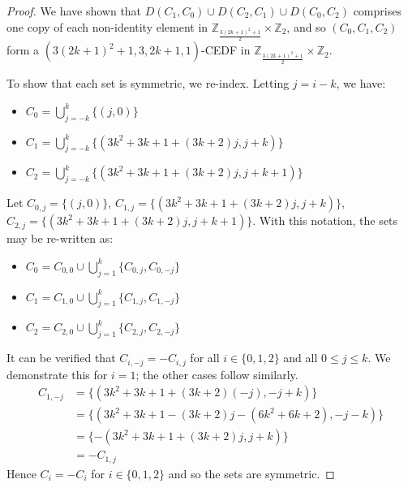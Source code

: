 \documentclass[12pt, a4paper]{article}
\theoremstyle{definition}
\begin{document}
\begin{proof}
We have shown that $D(C_1,C_0) \cup D(C_2,C_1) \cup D(C_0,C_2)$ comprises one copy of each non-identity element in $\mathbb{Z}_{\frac{3(2k+1)^2+1}{2}}\times\mathbb{Z}_2$, and so $(C_0,C_1,C_2)$ form a $(3(2k+1)^2+1,3,2k+1,1)$-CEDF in $\mathbb{Z}_{\frac{3(2k+1)^2+1}{2}}\times\mathbb{Z}_2$.

To show that each set is symmetric, we re-index. Letting $j =i-k$, we have:
\begin{itemize}
\item $C_0=\bigcup_{j=-k}^{k}\{(j,0)\}$
\item $C_1=\bigcup_{j=-k}^{k}\{(3k^2+3k+1+(3k+2)j,j+k)\}$
\item $C_2=\bigcup_{j=-k}^{k}\{(3k^2+3k+1+(3k+2)j,j+k+1)\}$
\end{itemize}
Let $C_{0,j}=\{(j,0)\}$, $C_{1,j}=\{(3k^2+3k+1+(3k+2)j,j+k)\}$, $C_{2,j}=\{(3k^2+3k+1+(3k+2)j,j+k+1)\}$.  With this notation, the sets may be re-written as:
\begin{itemize}
\item $C_0= C_{0,0} \cup \bigcup_{j=1}^{k}\{C_{0,j},C_{0,-j}\}$
\item $C_1= C_{1,0} \cup \bigcup_{j=1}^{k}\{C_{1,j},C_{1,-j}\}$
\item $C_2= C_{2,0} \cup \bigcup_{j=1}^{k}\{C_{2,j},C_{2,-j}\}$
\end{itemize}
It can be verified that $C_{i,-j}=-C_{i,j}$ for all $i \in \{0,1,2\}$ and all $0 \leq j \leq k$. We demonstrate this for $i=1$; the other cases follow similarly. 
\begin{align*}
C_{1,-j}&=\{(3k^2+3k+1+(3k+2)(-j),-j+k)\}\\
    &=\{(3k^2+3k+1-(3k+2)j-(6k^2+6k+2),-j-k)\}\\
    &=\{-(3k^2+3k+1+(3k+2)j,j+k)\} \\
    &= -C_{1,j}
\end{align*}
Hence $C_{i}=-C_i$ for $i \in \{0,1,2\}$ and so the sets are symmetric.
\end{proof}
\end{document}

